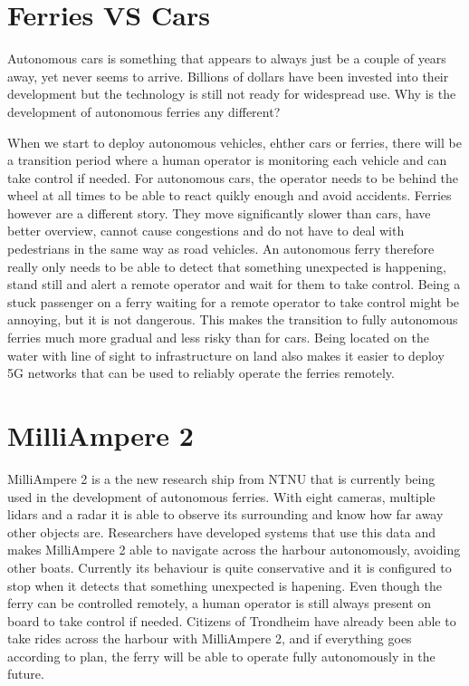 \documentclass{iopconfser}
\begin{document}
\section*{Ferries VS Cars}
Autonomous cars is something that appears to always just be a couple of years away, yet never seems to arrive.
Billions of dollars have been invested into their development but the technology is still not ready for widespread use. 
Why is the development of autonomous ferries any different?

When we start to deploy autonomous vehicles, ehther cars or ferries, there will be a transition period where a human operator is monitoring each vehicle and can take control if needed. 
For autonomous cars, the operator needs to be behind the wheel at all times to be able to react quikly enough and avoid accidents.
Ferries however are a different story.
They move significantly slower than cars, have better overview, cannot cause congestions and do not have to deal with pedestrians in the same way as road vehicles.
An autonomous ferry therefore really only needs to be able to detect that something unexpected is happening, stand still and alert a remote operator and wait for them to take control.
Being a stuck passenger on a ferry waiting for a remote operator to take control might be annoying, but it is not dangerous.
This makes the transition to fully autonomous ferries much more gradual and less risky than for cars.
Being located on the water with line of sight to infrastructure on land also makes it easier to deploy 5G networks that can be used to reliably operate the ferries remotely.

\section*{MilliAmpere 2}
MilliAmpere 2 is a the new research ship from NTNU that is currently being used in the development of autonomous ferries.
With eight cameras, multiple lidars and a radar it is able to observe its surrounding and know how far away other objects are.
Researchers have developed systems that use this data and makes MilliAmpere 2 able to navigate across the harbour autonomously, avoiding other boats.
Currently its behaviour is quite conservative and it is configured to stop when it detects that something unexpected is hapening.
Even though the ferry can be controlled remotely, a human operator is still always present on board to take control if needed.
Citizens of Trondheim have already been able to take rides across the harbour with MilliAmpere 2, and if everything goes according to plan, the ferry will be able to operate fully autonomously in the future.
\end{document}
